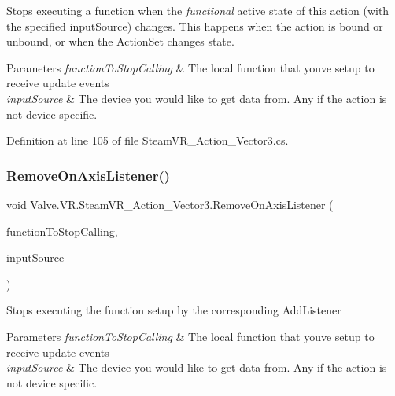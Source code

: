 Stops executing a function when the {\itshape functional} active state of this action (with the specified input\+Source) changes. This happens when the action is bound or unbound, or when the Action\+Set changes state. 


\begin{DoxyParams}{Parameters}
{\em function\+To\+Stop\+Calling} & The local function that you\textquotesingle{}ve setup to receive update events\\
\hline
{\em input\+Source} & The device you would like to get data from. Any if the action is not device specific.\\
\hline
\end{DoxyParams}


Definition at line 105 of file Steam\+V\+R\+\_\+\+Action\+\_\+\+Vector3.\+cs.

\mbox{\label{class_valve_1_1_v_r_1_1_steam_v_r___action___vector3_aa83da03bd829262cb3667db3394fdb35}} 
\subsubsection{\texorpdfstring{RemoveOnAxisListener()}{RemoveOnAxisListener()}}
{\footnotesize\ttfamily void Valve.\+V\+R.\+Steam\+V\+R\+\_\+\+Action\+\_\+\+Vector3.\+Remove\+On\+Axis\+Listener (\begin{DoxyParamCaption}\item[{\mbox{\hyperlink{class_valve_1_1_v_r_1_1_steam_v_r___action___vector3_a9b135b663b22c421dc36dbc48d2d35b6}{Axis\+Handler}}}]{function\+To\+Stop\+Calling,  }\item[{\mbox{\hyperlink{namespace_valve_1_1_v_r_a82e5bf501cc3aa155444ee3f0662853f}{Steam\+V\+R\+\_\+\+Input\+\_\+\+Sources}}}]{input\+Source }\end{DoxyParamCaption})}



Stops executing the function setup by the corresponding Add\+Listener 


\begin{DoxyParams}{Parameters}
{\em function\+To\+Stop\+Calling} & The local function that you\textquotesingle{}ve setup to receive update events\\
\hline
{\em input\+Source} & The device you would like to get data from. Any if the action is not device specific.\\
\hline
\end{DoxyParams}


